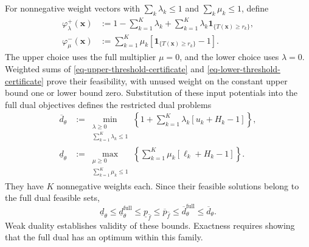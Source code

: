 For nonnegative weight vectors with $\sum_k\lambda_k\le1$ and $\sum_k\mu_k\le1$, define
\begin{equation}
  \begin{aligned}
    \varphi_\lambda^+(\bm x)&:=1-\sum_{k=1}^K\lambda_k+
    \sum_{k=1}^K\lambda_k\mathbf1_{\{T(\bm x)\ge r_k\}},\\
    \varphi_\mu^-(\bm x)&:=\sum_{k=1}^K\mu_k
    \left[\mathbf1_{\{T(\bm x)\ge r_k\}}-1\right].
  \end{aligned}
  \label{eq-restricted-dual-potentials}
\end{equation}
The upper choice uses the full multiplier $\mu=0$, and the lower choice uses $\lambda=0$. Weighted sums of \eqref{eq-upper-threshold-certificate} and \eqref{eq-lower-threshold-certificate} prove their feasibility, with unused weight on the constant upper bound one or lower bound zero. Substitution of these input potentials into the full dual objectives defines the restricted dual problems
\begin{align}
  \overline d_\theta
  &:=\min_{\substack{\lambda\ge0\\\sum_{k=1}^K\lambda_k\le1}}
  \left\{1+\sum_{k=1}^K\lambda_k\left[u_k+H_k-1\right]\right\},
  \label{eq-upper-restricted-dual}\\
  \underline d_\theta
  &:=\max_{\substack{\mu\ge0\\\sum_{k=1}^K\mu_k\le1}}
  \left\{\sum_{k=1}^K\mu_k\left[\ell_k+H_k-1\right]\right\}.
  \label{eq-lower-restricted-dual}
\end{align}
They have $K$ nonnegative weights each. Since their feasible solutions belong to the full dual feasible sets,
\begin{equation}
  \underline d_\theta\le\underline d_\theta^{\mathrm{full}}
  \le\underline p_{\hat f}\le\overline p_{\hat f}
  \le\overline d_\theta^{\mathrm{full}}\le\overline d_\theta.
  \label{eq-full-restricted-weak-chain}
\end{equation}
Weak duality establishes validity of these bounds. Exactness requires showing that the full dual has an optimum within this family.

